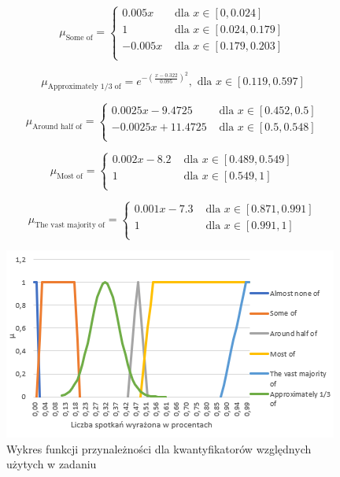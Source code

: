 \documentclass{classrep}
\begin{document}
  \begin{equation}
    \mu_{\text{Some of}} =
      \begin{cases}
        0.005x & \text{ dla } x \in [0,0.024] \\
        1 & \text{ dla } x \in [0.024,0.179] \\
        -0.005x & \text{ dla } x \in [0.179,0.203] \\
      \end{cases}  
  \end{equation}
  
  \begin{equation}
    \mu_{\text{Approximately 1/3 of}} = e^{-(\frac{x-0.322}{0.095})^2}, \text{ dla } x \in [0.119,0.597]
  \end{equation}

   \begin{equation}
    \mu_{\text{Around half of}} =
      \begin{cases}
        0.0025x - 9.4725 & \text{ dla } x \in [0.452,0.5] \\
        -0.0025x + 11.4725 & \text{ dla } x \in [0.5,0.548] \\
      \end{cases}  
  \end{equation}
  
  \begin{equation}
    \mu_{\text{Most of}} =
      \begin{cases}
        0.002x - 8.2 & \text{ dla } x \in [0.489,0.549] \\
        1 & \text{ dla } x \in [0.549,1] \\
      \end{cases}  
  \end{equation}
  
  \begin{equation}
    \mu_{\text{The vast majority of}} =
      \begin{cases}
        0.001x - 7.3 & \text{ dla } x \in [0.871,0.991] \\
        1 & \text{ dla } x \in [0.991,1] \\
      \end{cases}  
  \end{equation}
  
 \begin{figure}[H]
 \centering
   \includegraphics{wzgledne.png}
   \caption{Wykres funkcji przynależności dla kwantyfikatorów względnych użytych w zadaniu}
 \end{figure}
\end{document}
